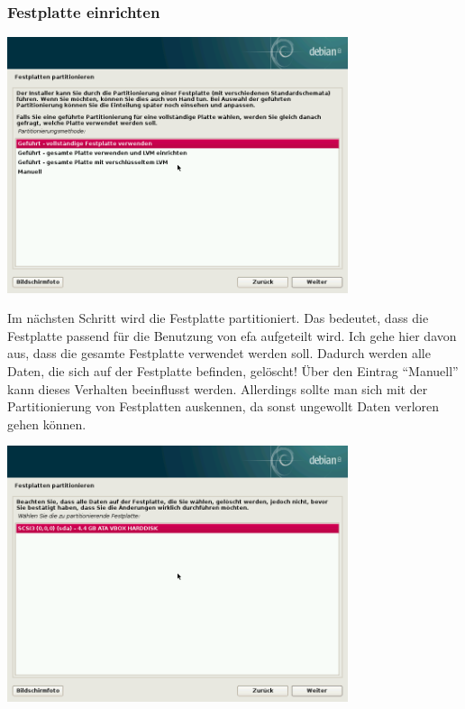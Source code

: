 \documentclass[a4paper,12pt,twoside]{article}
\begin{document}
\subsubsection{Festplatte einrichten}
\label{sct:inst_festplatte}

\begin{minipage}{\linewidth}
    \centering
    \captionsetup{type=figure}
    \includegraphics[width=10cm]{screenshots/select_partitioning.png}
    \label{fig:partitionierung}
\end{minipage}
\bigskip

Im nächsten Schritt wird die Festplatte partitioniert. Das bedeutet,
dass die Festplatte passend für die Benutzung von efa aufgeteilt wird.
Ich gehe hier davon aus, dass die gesamte Festplatte verwendet werden
soll. Dadurch werden alle Daten, die sich auf der Festplatte befinden,
gelöscht! Über den Eintrag "`Manuell"' kann
dieses Verhalten beeinflusst werden. Allerdings sollte man sich mit der
Partitionierung von Festplatten auskennen, da sonst ungewollt Daten
verloren gehen können.

\begin{minipage}{\linewidth}
    \centering
    \captionsetup{type=figure}
    \includegraphics[width=10cm]{screenshots/select_drive.png}
    \label{fig:auswahl_festplatte}
\end{minipage}
\end{document}
